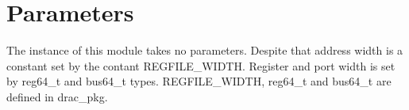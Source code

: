 \section{Parameters}
\label{chapter3}

The instance of this module takes no parameters. Despite that address width is a constant set by the contant REGFILE\_WIDTH. Register and port width is set by reg64\_t and bus64\_t types.
REGFILE\_WIDTH, reg64\_t and bus64\_t are defined in drac\_pkg.
